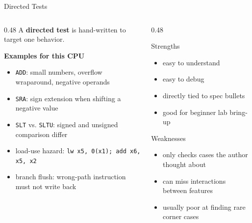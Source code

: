\documentclass[aspectratio=169,10pt]{beamer}
\begin{document}
\begin{frame}{Directed Tests}
  \begin{columns}[T]
    \begin{column}{0.48\textwidth}
      A \textbf{directed test} is hand-written to target one behavior.

      \vspace{0.7em}
      \textbf{Examples for this CPU}
      \begin{itemize}
        \item \texttt{ADD}: small numbers, overflow wraparound, negative operands
        \item \texttt{SRA}: sign extension when shifting a negative value
        \item \texttt{SLT} vs. \texttt{SLTU}: signed and unsigned comparison differ
        \item load-use hazard: \texttt{lw x5, 0(x1); add x6, x5, x2}
        \item branch flush: wrong-path instruction must not write back
      \end{itemize}
    \end{column}
    \begin{column}{0.48\textwidth}
      \begin{block}{Strengths}
        \begin{itemize}\small
          \item easy to understand
          \item easy to debug
          \item directly tied to spec bullets
          \item good for beginner lab bring-up
        \end{itemize}
      \end{block}

      \vspace{0.6em}
      \begin{alertblock}{Weaknesses}
        \begin{itemize}\small
          \item only checks cases the author thought about
          \item can miss interactions between features
          \item usually poor at finding rare corner cases
        \end{itemize}
      \end{alertblock}
    \end{column}
  \end{columns}
\end{frame}
\end{document}
